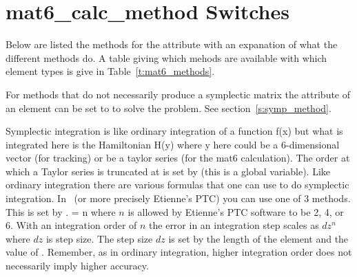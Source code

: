 \vfill \break

\section{mat6\_calc\_method Switches}
\label{s:xfer}

Below are listed the methods for the 
attribute with an expanation of what the different methods do. A
table giving which mehods are available with which element types is give
in Table~\ref{t:mat6_methods}. 

For methods that do not necessarily produce a symplectic matrix the
 attribute of an element can be set to  to
solve the problem. See section~\ref{s:symp_method}. 

Symplectic integration is like ordinary integration of a function f(x)
but what is integrated here is the Hamiltonian H(y) where y here could
be a 6-dimensional vector (for tracking) or be a taylor series (for
the mat6 calculation). The order at which a Taylor series is truncated
at is set by  (this is a global variable). Like
ordinary integration there are various formulas that one can use to do
symplectic integration. In \bmad\ (or more precisely Etienne's PTC)
you can use one of 3 methods. This is set by . 
 = n where $n$ is allowed by Etienne's PTC software
to be 2, 4, or 6. With an integration order of $n$
the error in an integration step scales as $dz^n$ where $dz$ is 
step size. The step size $dz$ is set by the length of the element and the
value of . Remember, as in ordinary integration, higher
integration order does not necessarily imply higher accuracy.

